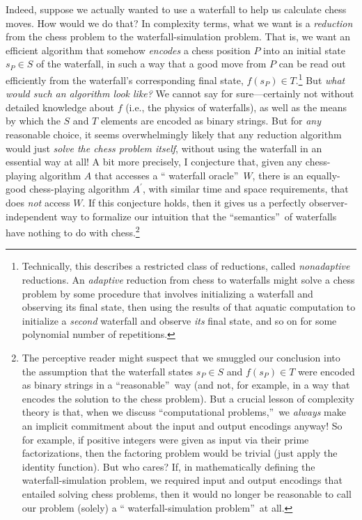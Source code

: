 \documentclass[12pt,onecolumn]{article}%
\begin{document}
Indeed, suppose we actually wanted to use a waterfall to help us calculate
chess moves. How would we do that? In complexity terms, what we want is a
\textit{reduction} from the chess problem to the waterfall-simulation problem.
 That is, we want an efficient algorithm that somehow \textit{encodes} a
chess position $P$ into an initial state $s_{P}\in S$ of the waterfall, in
such a way that a good move from $P$ can be read out efficiently from the
waterfall's corresponding final state, $f(s_{P})  \in
T$.\footnote{Technically, this describes a restricted class of reductions,
called \textit{nonadaptive} reductions. An \textit{adaptive} reduction from
chess to waterfalls might solve a chess problem by some procedure that
involves initializing a waterfall and observing its final state, then using
the results of that aquatic computation to initialize a \textit{second}
waterfall and observe \textit{its} final state, and so on for some polynomial
number of repetitions.} But \textit{what would such an algorithm look like?}
 We cannot say for sure---certainly not without detailed knowledge about
$f$ (i.e., the physics of waterfalls), as well as the means by which the $S$
and $T$ elements are encoded as binary strings. But for \textit{any}
reasonable choice, it seems overwhelmingly likely that any reduction algorithm
would just \textit{solve the chess problem itself}, without using the
waterfall in an essential way at all! A bit more precisely, I conjecture
that, given any chess-playing algorithm $A$ that accesses a \textquotedblleft
waterfall oracle\textquotedblright\  $W$, there is an equally-good
chess-playing algorithm $A^{\prime}$, with similar time and space
requirements, that does \textit{not} access $W$. If this conjecture holds,
then it gives us a perfectly observer-independent way to formalize our
intuition that the \textquotedblleft semantics\textquotedblright\  of
waterfalls have nothing to do with chess.\footnote{The perceptive reader might
suspect that we smuggled our conclusion into the assumption that the waterfall
states $s_{P}\in S$ and $f(  s_{P})  \in T$ were encoded as
binary strings in a \textquotedblleft reasonable\textquotedblright\  way (and
not, for example, in a way that encodes the solution to the chess problem).
 But a crucial lesson of complexity theory is that, when we discuss
\textquotedblleft computational problems,\textquotedblright\  we
\textit{always} make an implicit commitment about the input and output
encodings anyway! So for example, if positive integers were given as input
via their prime factorizations, then the factoring problem would be trivial
(just apply the identity function). But who cares? If, in mathematically
defining the waterfall-simulation problem, we required input and output
encodings that entailed solving chess problems, then it would no longer be
reasonable to call our problem (solely) a \textquotedblleft
waterfall-simulation problem\textquotedblright\  at all.}
\end{document}
